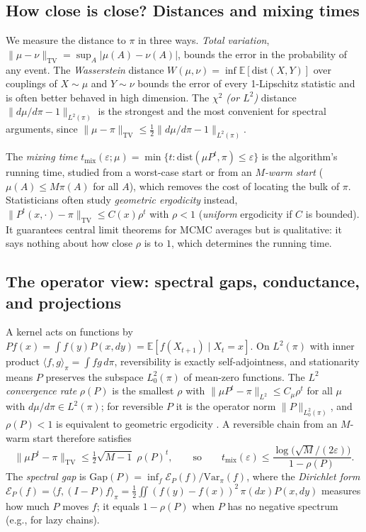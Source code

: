 \documentclass[11pt]{article}
\theoremstyle{remark}
\newcommand{\TV}{\mathrm{TV}}
\newcommand{\Gap}{\mathrm{Gap}}
\newcommand{\E}{\mathbb{E}}
\newcommand{\tmix}{t_{\mathrm{mix}}}
\begin{document}
\subsection{How close is close? Distances and mixing times}
We measure the distance to $\pi$ in three ways. \emph{Total variation}, $\|\mu-\nu\|_\TV=\sup_A|\mu(A)-\nu(A)|$, bounds the error in the probability of any event. The \emph{Wasserstein} distance $W(\mu,\nu)=\inf\E[\mathrm{dist}(X,Y)]$ over couplings of $X\sim\mu$ and $Y\sim\nu$ bounds the error of every 1-Lipschitz statistic and is often better behaved in high dimension. The \emph{$\chi^2$ (or $L^2$)} distance $\|d\mu/d\pi-1\|_{L^2(\pi)}$ is the strongest and the most convenient for spectral arguments, since $\|\mu-\pi\|_\TV\le\frac12\|d\mu/d\pi-1\|_{L^2(\pi)}$.

The \emph{mixing time} $\tmix(\varepsilon;\mu)=\min\{t:\mathrm{dist}(\mu P^t,\pi)\le\varepsilon\}$ is the algorithm's running time, studied from a worst-case start or from an \emph{$M$-warm start} ($\mu(A)\le M\pi(A)$ for all $A$), which removes the cost of locating the bulk of $\pi$. Statisticians often study \emph{geometric ergodicity} instead, $\|P^t(x,\cdot)-\pi\|_\TV\le C(x)\rho^t$ with $\rho<1$ (\emph{uniform} ergodicity if $C$ is bounded). It guarantees central limit theorems for MCMC averages but is qualitative: it says nothing about how close $\rho$ is to $1$, which determines the running time.

\subsection{The operator view: spectral gaps, conductance, and projections}\label{sec:operator}
A kernel acts on functions by $Pf(x)=\int f(y)P(x,dy)=\E[f(X_{t+1})\mid X_t=x]$. On $L^2(\pi)$ with inner product $\langle f,g\rangle_\pi=\int fg\,d\pi$, reversibility is exactly self-adjointness, and stationarity means $P$ preserves the subspace $L_0^2(\pi)$ of mean-zero functions. The \emph{$L^2$ convergence rate} $\rho(P)$ is the smallest $\rho$ with $\|\mu P^t-\pi\|_{L^2}\le C_\mu\rho^t$ for all $\mu$ with $d\mu/d\pi\in L^2(\pi)$; for reversible $P$ it is the operator norm $\|P\|_{L^2_0(\pi)}$, and $\rho(P)<1$ is equivalent to geometric ergodicity \citep{roberts1997geometric}. A reversible chain from an $M$-warm start therefore satisfies
\begin{equation}\label{eq:L2mix}
\|\mu P^t-\pi\|_\TV\le\tfrac12\sqrt{M-1}\;\rho(P)^t,\qquad\text{so}\qquad \tmix(\varepsilon)\le\frac{\log\bigl(\sqrt{M}/(2\varepsilon)\bigr)}{1-\rho(P)}.
\end{equation}
The \emph{spectral gap} is $\Gap(P)=\inf_f\mathcal E_P(f)/\mathrm{Var}_\pi(f)$, where the \emph{Dirichlet form} $\mathcal E_P(f)=\langle f,(I-P)f\rangle_\pi=\frac12\iint(f(y)-f(x))^2\,\pi(dx)P(x,dy)$ measures how much $P$ moves $f$; it equals $1-\rho(P)$ when $P$ has no negative spectrum (e.g., for lazy chains).
\end{document}
